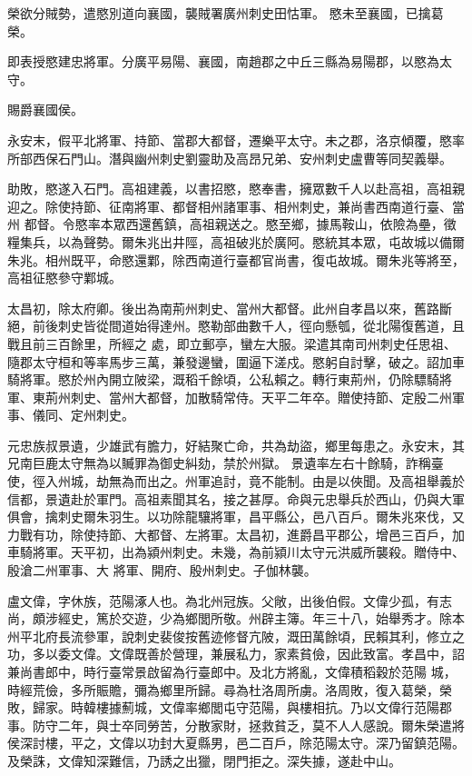 \begin{pinyinscope}
 榮欲分賊勢，遣愍別道向襄國，襲賊署廣州刺史田怙軍。
 愍未至襄國，已擒葛榮。



 即表授愍建忠將軍。分廣平易陽、襄國，南趙郡之中丘三縣為易陽郡，以愍為太守。



 賜爵襄國侯。



 永安末，假平北將軍、持節、當郡大都督，遷樂平太守。未之郡，洛京傾覆，愍率所部西保石門山。潛與幽州刺史劉靈助及高昂兄弟、安州刺史盧曹等同契義舉。



 助敗，愍遂入石門。高祖建義，以書招愍，愍奉書，擁眾數千人以赴高祖，高祖親迎之。除使持節、征南將軍、都督相州諸軍事、相州刺史，兼尚書西南道行臺、當州
 都督。令愍率本眾西還舊鎮，高祖親送之。愍至鄉，據馬鞍山，依險為壘，徵糧集兵，以為聲勢。爾朱兆出井陘，高祖破兆於廣阿。愍統其本眾，屯故城以備爾朱兆。相州既平，命愍還鄴，除西南道行臺都官尚書，復屯故城。爾朱兆等將至，高祖征愍參守鄴城。



 太昌初，除太府卿。後出為南荊州刺史、當州大都督。此州自孝昌以來，舊路斷絕，前後刺史皆從間道始得達州。愍勒部曲數千人，徑向懸瓠，從北陽復舊道，且戰且前三百餘里，所經之
 處，即立郵亭，蠻左大服。梁遣其南司州刺史任思祖、隨郡太守桓和等率馬步三萬，兼發邊蠻，圍逼下溠戍。愍躬自討擊，破之。詔加車騎將軍。愍於州內開立陂梁，溉稻千餘頃，公私賴之。轉行東荊州，仍除驃騎將軍、東荊州刺史、當州大都督，加散騎常侍。天平二年卒。贈使持節、定殷二州軍事、儀同、定州刺史。



 元忠族叔景遺，少雄武有膽力，好結聚亡命，共為劫盜，鄉里每患之。永安末，其兄南巨鹿太守無為以贓罪為御史糾劾，禁於州獄。
 景遺率左右十餘騎，詐稱臺使，徑入州城，劫無為而出之。州軍追討，竟不能制。由是以俠聞。及高祖舉義於信都，景遺赴於軍門。高祖素聞其名，接之甚厚。命與元忠舉兵於西山，仍與大軍俱會，擒刺史爾朱羽生。以功除龍驤將軍，昌平縣公，邑八百戶。爾朱兆來伐，又力戰有功，除使持節、大都督、左將軍。太昌初，進爵昌平郡公，增邑三百戶，加車騎將軍。天平初，出為潁州刺史。未幾，為前潁川太守元洪威所襲殺。贈侍中、殷滄二州軍事、大
 將軍、開府、殷州刺史。子伽林襲。



 盧文偉，字休族，范陽涿人也。為北州冠族。父敞，出後伯假。文偉少孤，有志尚，頗涉經史，篤於交遊，少為鄉閭所敬。州辟主簿。年三十八，始舉秀才。除本州平北府長流參軍，說刺史裴俊按舊迹修督亢陂，溉田萬餘頃，民賴其利，修立之功，多以委文偉。文偉既善於營理，兼展私力，家素貧儉，因此致富。孝昌中，詔兼尚書郎中，時行臺常景啟留為行臺郎中。及北方將亂，文偉積稻穀於范陽
 城，時經荒儉，多所賑贍，彌為鄉里所歸。尋為杜洛周所虜。洛周敗，復入葛榮，榮敗，歸家。時韓樓據薊城，文偉率鄉閭屯守范陽，與樓相抗。乃以文偉行范陽郡事。防守二年，與士卒同勞苦，分散家財，拯救貧乏，莫不人人感說。爾朱榮遣將侯深討樓，平之，文偉以功封大夏縣男，邑二百戶，除范陽太守。深乃留鎮范陽。及榮誅，文偉知深難信，乃誘之出獵，閉門拒之。深失據，遂赴中山。




\end{pinyinscope}
